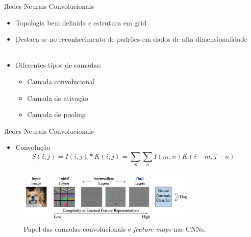 \begin{frame}{Redes Neurais Convolucionais}
   \ \  \\[0.1cm]
   \begin{itemize}
     \item Topologia bem definida e estrutura em grid
    \item Destaca-se no reconhecimento de padrões em dados de alta dimensionalidade
     \ \ \newline
     \item Diferentes tipos de camadas:
     \begin{itemize}
       \item Camada convolucional
       \item Camada de ativação
       \item Camada de pooling
     \end{itemize}

   \end{itemize}
\end{frame}

\begin{frame}{Redes Neurais Convolucionais}
   \ \  \\[0.1cm]
   \begin{itemize}
     \item Convolução
     \begin{equation}
      S(i,j) = I(i,j)*K(i,j) = \sum_{m}\sum_{n}I(m,n)K(i-m,j-n)\label{eq:conv_img}
     \end{equation}
   \end{itemize}
   \begin{figure}[!h]
   	\centering
   	\label{fig:convolutions}
   	\includegraphics[width=0.8\textwidth]{./img/fundamenta/convolutions}
     \caption{Papel das camadas convolucionais e \emph{feature maps} nas CNNs.}
   \end{figure}
\end{frame}

